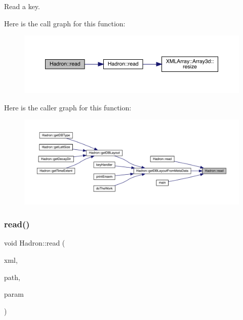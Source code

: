 Read a key. 

Here is the call graph for this function\+:
\nopagebreak
\begin{figure}[H]
\begin{center}
\leavevmode
\includegraphics[width=350pt]{d1/daf/namespaceHadron_a61520b9a5ce2b207d1c01e1508a5c470_cgraph}
\end{center}
\end{figure}
Here is the caller graph for this function\+:
\nopagebreak
\begin{figure}[H]
\begin{center}
\leavevmode
\includegraphics[width=350pt]{d1/daf/namespaceHadron_a61520b9a5ce2b207d1c01e1508a5c470_icgraph}
\end{center}
\end{figure}
\mbox{\label{namespaceHadron_adde6149254919751c9f0e1b2b12c4d17}} 
\subsubsection{\texorpdfstring{read()}{read()}\hspace{0.1cm}{\footnotesize\ttfamily [22/94]}}
{\footnotesize\ttfamily void Hadron\+::read (\begin{DoxyParamCaption}\item[{\mbox{\hyperlink{classADATXML_1_1XMLReader}{X\+M\+L\+Reader}} \&}]{xml,  }\item[{const std\+::string \&}]{path,  }\item[{\mbox{\hyperlink{structHadron_1_1KeyMesonElementalOperator__t}{Key\+Meson\+Elemental\+Operator\+\_\+t}} \&}]{param }\end{DoxyParamCaption})}




